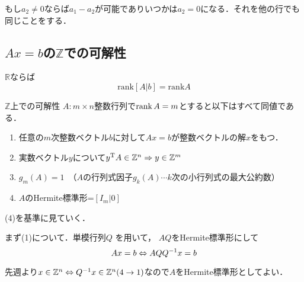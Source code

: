もし$a_2 \neq 0$ならば$a_1 -a_2$が可能でありいつかは$a_2 =0$になる．それを他の行でも同じことをする．

\subsection{\texorpdfstring{$Ax=b$の$\mathbb{Z}$} 上での可解性}
$\mathbb{R}$ならば
\begin{equation}
    \mathrm{rank}[A|b] = \mathrm{rank} A
\end{equation}
\begin{itembox}[l]{$\mathbb{Z}$上での可解性}
  $A:m\times n$整数行列で$\rank{A}=m$とすると以下はすべて同値である．
\begin{enumerate}
  \item 任意の$m$次整数ベクトル$b$に対して$Ax=b$が整数ベクトルの解$x$をもつ．
  \item 実数ベクトル$y$について${y}^{\mathrm{T}}A\in{\mathbb{Z}}^n \Rightarrow y\in{\mathbb{Z}}^m$
  \item $g_m (A)=1$　（$A$の行列式因子$g_k (A)\cdots k$次の小行列式の最大公約数）
  
  \item $A$のHermite標準形=$[I_m |0]$
\end{enumerate}
\end{itembox}
(4)を基準に見ていく．

まず(1)について．単模行列$Q$
を用いて，
$AQ$をHermite標準形にして
\begin{equation}
    Ax=b\Leftrightarrow AQ{Q}^{-1}x=b
\end{equation}

先週より$x\in{\mathbb{Z}}^n \Leftrightarrow{Q}^{-1}x\in{\mathbb{Z}}^n (4\to 1)$なので$A$をHermite標準形としてよい．


